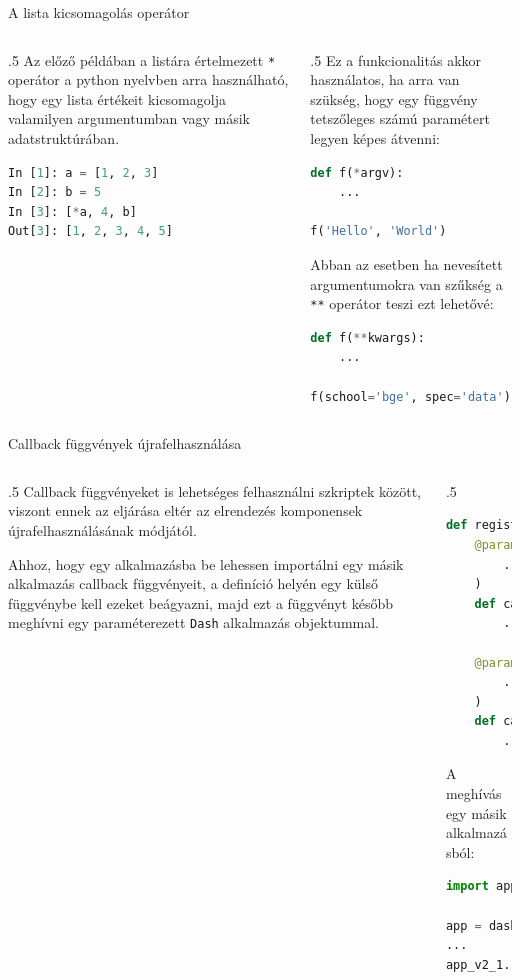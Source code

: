 \documentclass[english, aspectratio=169]{beamer}
\begin{document}
	\begin{frame}[fragile]{A lista kicsomagolás operátor}
		\begin{columns}
			\begin{column}{.5\textwidth}
				Az előző példában a listára értelmezett \texttt{*} operátor a python nyelvben arra használható, hogy egy lista értékeit kicsomagolja valamilyen argumentumban vagy másik adatstruktúrában.
				\begin{lstlisting}[language=python]
In [1]: a = [1, 2, 3]
In [2]: b = 5
In [3]: [*a, 4, b]
Out[3]: [1, 2, 3, 4, 5]
				\end{lstlisting}
			\end{column}
			\begin{column}{.5\textwidth}
				Ez a funkcionalitás akkor használatos, ha arra van szükség, hogy egy függvény tetszőleges számú paramétert legyen képes átvenni:
				\begin{lstlisting}[language=python]
def f(*argv):
	...
	
f('Hello', 'World')
				\end{lstlisting}
				Abban az esetben ha nevesített argumentumokra van szűkség a \texttt{**} operátor teszi ezt lehetővé:
				\begin{lstlisting}[language=python]
def f(**kwargs):
	...

f(school='bge', spec='data')
				\end{lstlisting}
			\end{column}
		\end{columns}
	\end{frame}
	
	\begin{frame}[fragile]{Callback függvények újrafelhasználása}
		\begin{columns}
			\begin{column}{.5\textwidth}
				Callback függvényeket is lehetséges felhasználni szkriptek között, viszont ennek az eljárása eltér az elrendezés komponensek újrafelhasználásának módjától.\par\smallskip
				Ahhoz, hogy egy alkalmazásba be lehessen importálni egy másik alkalmazás callback függvényeit, a definíció helyén egy külső függvénybe kell ezeket beágyazni, majd ezt a függvényt később meghívni egy paraméterezett \texttt{Dash} alkalmazás objektummal.
			\end{column}
			\begin{column}{.5\textwidth}
				\begin{lstlisting}[language=python]
def register_callbacks(param_app):
	@param_app.callback(
		...
	)
	def callback1(...):
		...
	
	@param_app.callback(
		...
	)
	def callback2(...):
		...				
				\end{lstlisting}
				A meghívás egy másik alkalmazásból:
				\begin{lstlisting}[language=python]
import app_v2_1

app = dash.Dash(__name___)
...
app_v2_1.register_callbacks(app)
				\end{lstlisting}
			\end{column}
		\end{columns}
	\end{frame}
\end{document}
